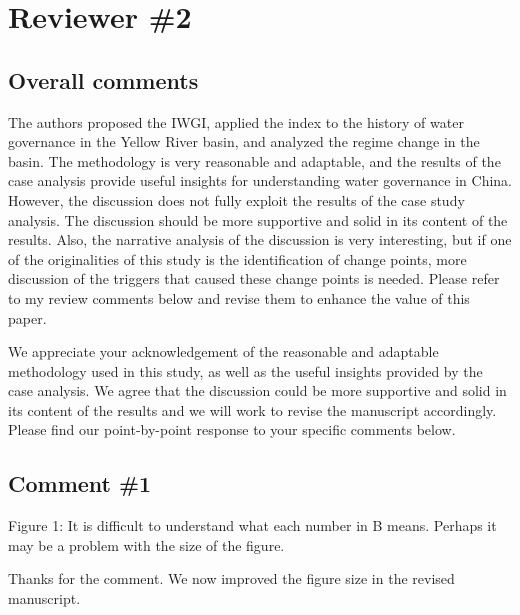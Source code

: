 \section{Reviewer \#2}\label{reviewer_2}

\subsection*{Overall comments}
\RC{} The authors proposed the IWGI, applied the index to the history of water governance in the Yellow River basin, and analyzed the regime change in the basin. The methodology is very reasonable and adaptable, and the results of the case analysis provide useful insights for understanding water governance in China. However, the discussion does not fully exploit the results of the case study analysis. The discussion should be more supportive and solid in its content of the results. Also, the narrative analysis of the discussion is very interesting, but if one of the originalities of this study is the identification of change points, more discussion of the triggers that caused these change points is needed. Please refer to my review comments below and revise them to enhance the value of this paper.

\AR{} We appreciate your acknowledgement of the reasonable and adaptable methodology used in this study, as well as the useful insights provided by the case analysis. We agree that the discussion could be more supportive and solid in its content of the results and we will work to revise the manuscript accordingly. Please find our point-by-point response to your specific comments below.

\subsection{Comment \#1}
\RC{} Figure 1: It is difficult to understand what each number in B means. Perhaps it may be a problem with the size of the figure.

\AR{} Thanks for the comment. We now improved the figure size in the revised manuscript.

